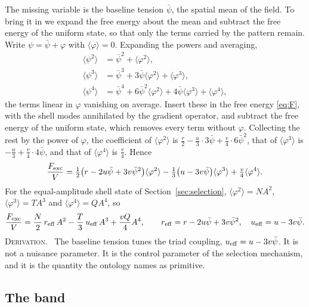 \documentclass[a4paper,11pt]{article}
\makeatletter
\numberwithin{equation}{section}
\theoremstyle{jsplain}
\theoremstyle{jsrem}
\newcommand{\lbl}[1]{\textcolor{lbl@#1}{\textsc{#1}}.\ }
\makeatother
\begin{document}
The missing variable is the baseline tension $\bar\psi$, the spatial mean of the field. To bring it in we expand the free energy about the mean and subtract the free energy of the uniform state, so that only the terms carried by the pattern remain. Write $\psi=\bar\psi+\varphi$ with $\langle\varphi\rangle=0$. Expanding the powers and averaging,
\begin{align*}
\langle\psi^2\rangle&=\bar\psi^2+\langle\varphi^2\rangle,\\
\langle\psi^3\rangle&=\bar\psi^3+3\bar\psi\langle\varphi^2\rangle+\langle\varphi^3\rangle,\\
\langle\psi^4\rangle&=\bar\psi^4+6\bar\psi^2\langle\varphi^2\rangle+4\bar\psi\langle\varphi^3\rangle+\langle\varphi^4\rangle ,
\end{align*}
the terms linear in $\varphi$ vanishing on average. Insert these in the free energy \eqref{eq:F}, with the shell modes annihilated by the gradient operator, and subtract the free energy of the uniform state, which removes every term without $\varphi$. Collecting the rest by the power of $\varphi$, the coefficient of $\langle\varphi^2\rangle$ is $\tfrac r2-\tfrac u3\cdot3\bar\psi+\tfrac v4\cdot6\bar\psi^2$, that of $\langle\varphi^3\rangle$ is $-\tfrac u3+\tfrac v4\cdot4\bar\psi$, and that of $\langle\varphi^4\rangle$ is $\tfrac v4$. Hence
\begin{equation}\label{eq:Fexcphi}
\frac{F_{\rm exc}}{V}=\tfrac12\big(r-2u\bar\psi+3v\bar\psi^2\big)\langle\varphi^2\rangle-\tfrac13\big(u-3v\bar\psi\big)\langle\varphi^3\rangle+\tfrac v4\langle\varphi^4\rangle .
\end{equation}
For the equal-amplitude shell state of Section~\ref{sec:selection}, $\langle\varphi^2\rangle=NA^2$, $\langle\varphi^3\rangle=TA^3$ and $\langle\varphi^4\rangle=QA^4$, so
\begin{equation}\label{eq:Fmod}
\frac{F_{\rm exc}}{V}=\frac N2\,r_{\rm eff}\,A^2-\frac T3\,u_{\rm eff}\,A^3+\frac{vQ}{4}A^4,\qquad
r_{\rm eff}=r-2u\bar\psi+3v\bar\psi^2,\quad u_{\rm eff}=u-3v\bar\psi .
\end{equation}
\lbl{Derivation} The baseline tension tunes the triad coupling, $u_{\rm eff}=u-3v\bar\psi$. It is not a nuisance parameter. It is the control parameter of the selection mechanism, and it is the quantity the ontology names as primitive.

\subsection{The band}
\end{document}
